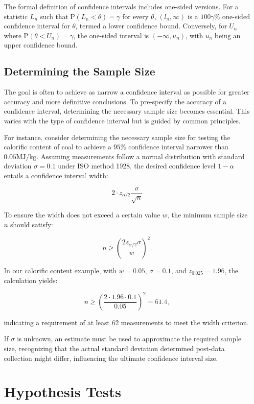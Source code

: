 \documentclass{article}
\begin{document}
The formal definition of confidence intervals includes one-sided versions. For a statistic $L_{n}$ such that $\mathrm{P}(L_{n} < \theta) = \gamma$ for every $\theta$, $\left(l_{n}, \infty\right)$ is a $100\gamma\%$ one-sided confidence interval for $\theta$, termed a lower confidence bound. Conversely, for $U_{n}$ where $\mathrm{P}(\theta < U_{n}) = \gamma$, the one-sided interval is $\left(-\infty, u_{n}\right)$, with $u_{n}$ being an upper confidence bound.

\subsection{Determining the Sample Size}

The goal is often to achieve as narrow a confidence interval as possible for greater accuracy and more definitive conclusions. To pre-specify the accuracy of a confidence interval, determining the necessary sample size becomes essential. This varies with the type of confidence interval but is guided by common principles.

For instance, consider determining the necessary sample size for testing the calorific content of coal to achieve a $95\%$ confidence interval narrower than $0.05 \mathrm{MJ}/\mathrm{kg}$. Assuming measurements follow a normal distribution with standard deviation $\sigma = 0.1$ under ISO method 1928, the desired confidence level $1-\alpha$ entails a confidence interval width:

\[
2 \cdot z_{\alpha / 2} \frac{\sigma}{\sqrt{n}}
\]

To ensure the width does not exceed a certain value $w$, the minimum sample size $n$ should satisfy:

\[
n \geq \left(\frac{2 z_{\alpha / 2} \sigma}{w}\right)^2.
\]

In our calorific content example, with $w = 0.05$, $\sigma = 0.1$, and $z_{0.025} = 1.96$, the calculation yields:

\[
n \geq \left(\frac{2 \cdot 1.96 \cdot 0.1}{0.05}\right)^2 = 61.4,
\]

indicating a requirement of at least 62 measurements to meet the width criterion.

If $\sigma$ is unknown, an estimate must be used to approximate the required sample size, recognizing that the actual standard deviation determined post-data collection might differ, influencing the ultimate confidence interval size.

\section{Hypothesis Tests}
\end{document}
